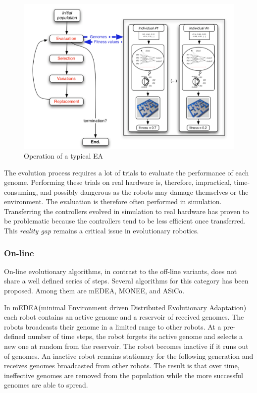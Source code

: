 \begin{figure}[H]
	
	\centering
	\includegraphics[width=\textwidth]{chapters/res/offline-ea.png}
	\caption{Operation of a typical EA\cite{doncieux_evolutionary_2011}}
	\label{fig:offline-ea}
\end{figure}

The evolution process requires a lot of trials to evaluate the performance of each genome. Performing these trials on real hardware is, therefore, impractical, time-consuming, and possibly dangerous as the robots may damage themselves or the environment.
The evaluation is therefore often performed in simulation\cite{koos_crossing_2010}.
Transferring the controllers evolved in simulation to real hardware has proven to be problematic because the controllers tend to be less efficient once transferred.
This \emph{reality gap} remains a critical issue in evolutionary robotics\cite{koos_crossing_2010}.



\subsubsection*{On-line}
On-line evolutionary algorithms, in contrast to the off-line variants, does not share a well defined series of steps. Several algorithms for this category has been proposed. Among them are mEDEA\cite{montanier_adaptive_2014}, MONEE\cite{noskov_monee:_2013}, and ASiCo\cite{hutchison_task-driven_2011}. 

In mEDEA(minimal Environment driven Distributed Evolutionary Adaptation) each robot contains an active genome and a reservoir of received genomes.
The robots broadcasts their genome in a limited range to other robots.
At a pre-defined number of time steps, the robot forgets its active genome and selects a new one at random from the reservoir.
The robot becomes inactive if it runs out of genomes.
An inactive robot remains stationary for the following generation and receives genomes broadcasted from other robots.
The result is that over time, ineffective genomes are removed from the population while the more successful genomes are able to spread.

